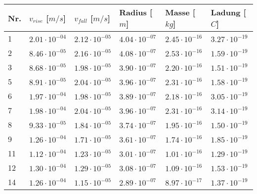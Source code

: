 \begin{table}[h]
	\centering
	\begin{tabular}{llllll}
		\toprule
		Nr. & $v_{rise}$ [$m/s$] & $v_{fall}$ [$m/s$] & Radius [$m$] & Masse [$kg$] & Ladung [$C$]  \\
		\midrule
		1 &$\mathrm{2.01 \cdot 10^{-04}}$ & $\mathrm{2.12 \cdot 10^{-05}}$ & $\mathrm{4.04 \cdot 10^{-07}}$ & $\mathrm{2.45 \cdot 10^{-16}}$ & $\mathrm{3.27 \cdot 10^{-19}}$ \\
		2 &$\mathrm{8.46 \cdot 10^{-05}}$ & $\mathrm{2.16 \cdot 10^{-05}}$ & $\mathrm{4.08 \cdot 10^{-07}}$ & $\mathrm{2.53 \cdot 10^{-16}}$ & $\mathrm{1.59 \cdot 10^{-19}}$ \\
		3 &$\mathrm{8.68 \cdot 10^{-05}}$ & $\mathrm{1.98 \cdot 10^{-05}}$ & $\mathrm{3.90 \cdot 10^{-07}}$ & $\mathrm{2.20 \cdot 10^{-16}}$ & $\mathrm{1.51 \cdot 10^{-19}}$ \\
		5 &$\mathrm{8.91 \cdot 10^{-05}}$ & $\mathrm{2.04 \cdot 10^{-05}}$ & $\mathrm{3.96 \cdot 10^{-07}}$ & $\mathrm{2.31 \cdot 10^{-16}}$ & $\mathrm{1.58 \cdot 10^{-19}}$ \\
		6 &$\mathrm{1.97 \cdot 10^{-04}}$ & $\mathrm{1.98 \cdot 10^{-05}}$ & $\mathrm{3.89 \cdot 10^{-07}}$ & $\mathrm{2.18 \cdot 10^{-16}}$ & $\mathrm{3.05 \cdot 10^{-19}}$ \\
		7 &$\mathrm{1.98 \cdot 10^{-04}}$ & $\mathrm{2.04 \cdot 10^{-05}}$ & $\mathrm{3.96 \cdot 10^{-07}}$ & $\mathrm{2.31 \cdot 10^{-16}}$ & $\mathrm{3.14 \cdot 10^{-19}}$ \\
		8 &$\mathrm{9.33 \cdot 10^{-05}}$ & $\mathrm{1.84 \cdot 10^{-05}}$ & $\mathrm{3.74 \cdot 10^{-07}}$ & $\mathrm{1.95 \cdot 10^{-16}}$ & $\mathrm{1.50 \cdot 10^{-19}}$ \\
		9 &$\mathrm{1.26 \cdot 10^{-04}}$ & $\mathrm{1.71 \cdot 10^{-05}}$ & $\mathrm{3.61 \cdot 10^{-07}}$ & $\mathrm{1.74 \cdot 10^{-16}}$ & $\mathrm{1.85 \cdot 10^{-19}}$ \\
		11 &$\mathrm{1.12 \cdot 10^{-04}}$ & $\mathrm{1.23 \cdot 10^{-05}}$ & $\mathrm{3.01 \cdot 10^{-07}}$ & $\mathrm{1.01 \cdot 10^{-16}}$ & $\mathrm{1.29 \cdot 10^{-19}}$ \\
		12 &$\mathrm{1.30 \cdot 10^{-04}}$ & $\mathrm{1.29 \cdot 10^{-05}}$ & $\mathrm{3.08 \cdot 10^{-07}}$ & $\mathrm{1.09 \cdot 10^{-16}}$ & $\mathrm{1.53 \cdot 10^{-19}}$ \\
		14 &$\mathrm{1.26 \cdot 10^{-04}}$ & $\mathrm{1.15 \cdot 10^{-05}}$ & $\mathrm{2.89 \cdot 10^{-07}}$ & $\mathrm{8.97 \cdot 10^{-17}}$ & $\mathrm{1.37 \cdot 10^{-19}}$ \\

\end{tabular}
\end{table}
